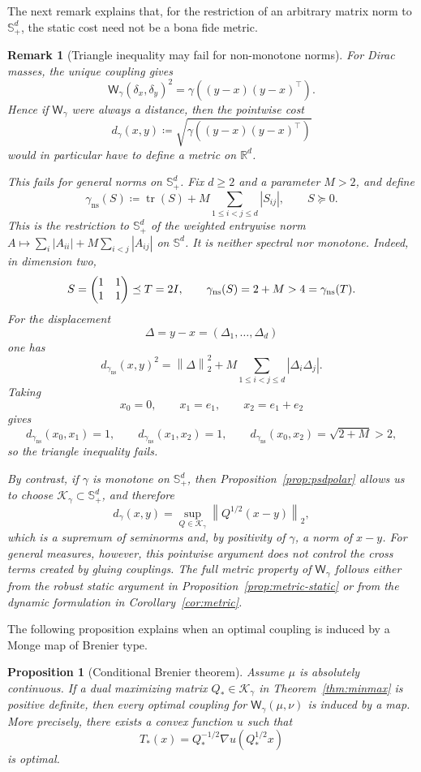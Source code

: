 \documentclass{article}
\newtheorem{proposition}[theorem]{Proposition}
\newtheorem{remark}[theorem]{Remark}
\newcommand{\R}{\mathbb{R}}
\newcommand{\Wg}{\mathsf{W}_{\gamma}}
\newcommand{\tr}{\operatorname{tr}}
\newcommand{\norm}[1]{\left\lVert #1 \right\rVert}
\newcommand{\abs}[1]{\left\lvert #1 \right\rvert}
\newcommand{\cK}{\mathcal K_\gamma}
\begin{document}
The next remark explains that, for the restriction of an arbitrary matrix
norm to $\mathbb S_+^d$, the static cost need not be a bona fide metric.
\begin{remark}[Triangle inequality may fail for non-monotone norms]
\label{rem:notmetric}
For Dirac masses, the unique coupling gives
$$
\Wg(\delta_x,\delta_y)^2
=
\gamma\!\left((y-x)(y-x)^\top\right).
$$
Hence if $\Wg$ were always a distance, then the pointwise cost
$$
d_\gamma(x,y)
\coloneqq 
\sqrt{\gamma\!\left((y-x)(y-x)^\top\right)}
$$
would in particular have to define a metric on $\R^d$.

This fails for general norms on $\mathbb S_+^d$. Fix $d\ge 2$ and a parameter $M>2$, and define
$$
\gamma_{\mathrm{ns}}(S)
\coloneqq 
\tr(S)+M\sum_{1\le i<j\le d}\abs{S_{ij}},
\qquad S\succeq 0.
$$
This is the restriction to $\mathbb S_+^d$ of the weighted entrywise norm
$A\mapsto\sum_i|A_{ii}|+M\sum_{i<j}|A_{ij}|$ on $\mathbb S^d$. It is neither
spectral nor monotone. Indeed, in dimension two,
\[
 S=\begin{pmatrix}1&1\\1&1\end{pmatrix}
 \preceq
 T=2I,
 \qquad
 \gamma_{\rm ns}(S)=2+M>4=\gamma_{\rm ns}(T).
\]
For the displacement
$$
\Delta=y-x=(\Delta_1,\dots,\Delta_d)
$$
one has
$$
d_{\gamma_{\mathrm{ns}}}(x,y)^2
=
\norm{\Delta}_2^2
+
M\sum_{1\le i<j\le d}\abs{\Delta_i\Delta_j}.
$$
Taking
$$
x_0=0,
\qquad
x_1=e_1,
\qquad
x_2=e_1+e_2
$$
gives
$$
d_{\gamma_{\mathrm{ns}}}(x_0,x_1)=1,
\qquad
d_{\gamma_{\mathrm{ns}}}(x_1,x_2)=1,
\qquad
d_{\gamma_{\mathrm{ns}}}(x_0,x_2)=\sqrt{2+M}>2,
$$
so the triangle inequality fails.

By contrast, if $\gamma$ is monotone on $\mathbb S_+^d$, then Proposition~\ref{prop:psdpolar} allows us to choose $\cK\subset \mathbb S_+^d$, and therefore
$$
d_\gamma(x,y)
=
\sup_{Q\in\cK}\norm{Q^{1/2}(x-y)}_2,
$$
which is a supremum of seminorms and, by positivity of $\gamma$, a norm of
$x-y$. For general measures, however, this pointwise argument does not control
the cross terms created by gluing couplings. The full metric property of $\Wg$
follows either from the robust static argument in
Proposition~\ref{prop:metric-static} or from the dynamic formulation in
Corollary~\ref{cor:metric}.
\end{remark}



The following proposition explains when an optimal coupling is induced by a Monge map of Brenier type.
\begin{proposition}[Conditional Brenier theorem]
\label{cor:brenier}
Assume $\mu$ is absolutely continuous. If a dual maximizing matrix
$Q_*\in\cK$ in Theorem~\ref{thm:minmax} is positive definite, then every
optimal coupling for $\Wg(\mu,\nu)$ is induced by a map. More precisely,
there exists a convex function $u$ such that
$$
T_*(x)=Q_*^{-1/2}\nabla u(Q_*^{1/2}x)
$$
is optimal.
\end{proposition}
\end{document}
